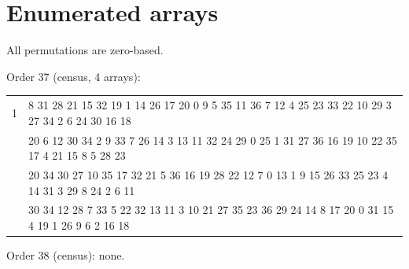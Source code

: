 \documentclass[11pt]{article}
\begin{document}
\section{Enumerated arrays}
\label{app:arrays}

All permutations are zero-based.

\vspace{2.5em}

\noindent Order 37 (census, 4 arrays):\par\nopagebreak
\begingroup\small
\noindent\begin{tabular}{@{}r@{\hskip 8pt}>{\ttfamily\raggedright\arraybackslash}p{}@{}}
\toprule
1 & 13 8 31 28 21 15 32 19 1 14 26 17 20 0 9 5 35 11 36 7 12 4 25 23 33 22 10 29 3 27 34 2 6 24 30 16 18\\
\addlinespace
2 & 18 20 6 12 30 34 2 9 33 7 26 14 3 13 11 32 24 29 0 25 1 31 27 36 16 19 10 22 35 17 4 21 15 8 5 28 23\\
\addlinespace
3 & 18 20 34 30 27 10 35 17 32 21 5 36 16 19 28 22 12 7 0 13 1 9 15 26 33 25 23 4 14 31 3 29 8 24 2 6 11\\
\addlinespace
4 & 25 30 34 12 28 7 33 5 22 32 13 11 3 10 21 27 35 23 36 29 24 14 8 17 20 0 31 15 4 19 1 26 9 6 2 16 18\\
\bottomrule
\end{tabular}
\endgroup

\vspace{2.5em}

\noindent Order 38 (census): none.

\vspace{2.5em}
\end{document}
